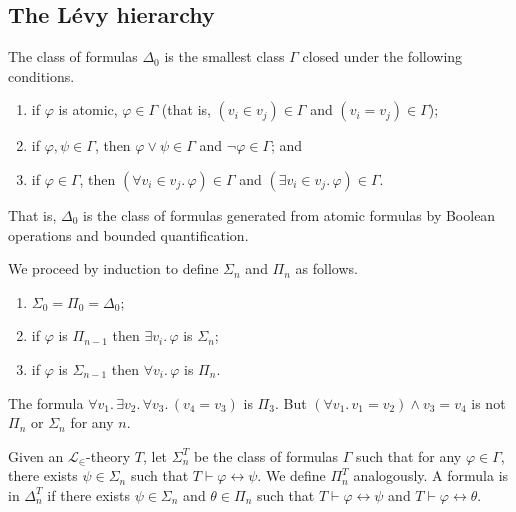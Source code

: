 \subsection{The L\'evy hierarchy}
\begin{definition}
    The class of formulas \( \Delta_0 \) is the smallest class \( \Gamma \) closed under the following conditions.
    \begin{enumerate}
        \item if \( \varphi \) is atomic, \( \varphi \in \Gamma \) (that is, \( (v_i \in v_j) \in \Gamma \) and \( (v_i = v_j) \in \Gamma \));
        \item if \( \varphi, \psi \in \Gamma \), then \( \varphi \vee \psi \in \Gamma \) and \( \neg\varphi \in \Gamma \); and
        \item if \( \varphi \in \Gamma \), then \( (\forall v_i \in v_j.\, \varphi) \in \Gamma \) and \( (\exists v_i \in v_j.\, \varphi) \in \Gamma \).
    \end{enumerate}
\end{definition}
That is, \( \Delta_0 \) is the class of formulas generated from atomic formulas by Boolean operations and bounded quantification.
\begin{definition}
    We proceed by induction to define \( \Sigma_n \) and \( \Pi_n \) as follows.
    \begin{enumerate}
        \item \( \Sigma_0 = \Pi_0 = \Delta_0 \);
        \item if \( \varphi \) is \( \Pi_{n-1} \) then \( \exists v_i.\, \varphi \) is \( \Sigma_n \);
        \item if \( \varphi \) is \( \Sigma_{n-1} \) then \( \forall v_i.\, \varphi \) is \( \Pi_n \).
    \end{enumerate}
\end{definition}
\begin{example}
    The formula \( \forall v_1.\, \exists v_2.\, \forall v_3.\, (v_4 = v_3) \) is \( \Pi_3 \).
    But \( (\forall v_1.\, v_1 = v_2) \wedge v_3 = v_4 \) is not \( \Pi_n \) or \( \Sigma_n \) for any \( n \).
\end{example}
\begin{definition}
    Given an \( \mathcal L_\in \)-theory \( T \), let \( \Sigma_n^T \) be the class of formulas \( \Gamma \) such that for any \( \varphi \in \Gamma \), there exists \( \psi \in \Sigma_n \) such that \( T \vdash \varphi \leftrightarrow \psi \).
    We define \( \Pi_n^T \) analogously.
    A formula is in \( \Delta_n^T \) if there exists \( \psi \in \Sigma_n \) and \( \theta \in \Pi_n \) such that \( T \vdash \varphi \leftrightarrow \psi \) and \( T \vdash \varphi \leftrightarrow \theta \).
\end{definition}
